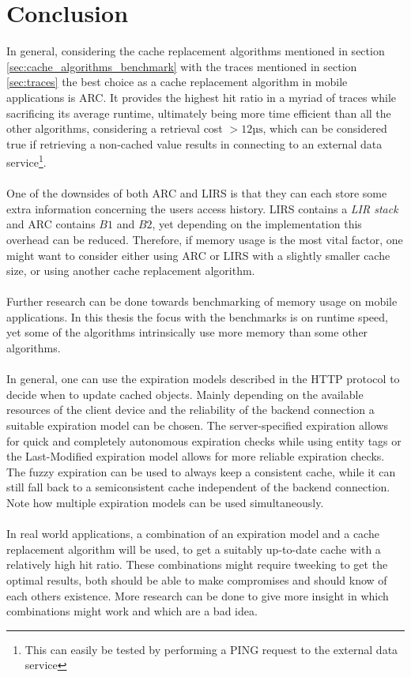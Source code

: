 \documentclass[pdftex,a4paper,12pt,twoside]{report}
\begin{document}
\chapter{Conclusion}
\label{ch:conclusion}
In general, considering the cache replacement algorithms mentioned in section \ref{sec:cache_algorithms_benchmark} with the traces mentioned in section \ref{sec:traces} the best choice as a cache replacement algorithm in mobile applications is ARC. It provides the highest hit ratio in a myriad of traces while sacrificing its average runtime, ultimately being more time efficient than all the other algorithms, considering a retrieval cost $> 12\text{µs}$, which can be considered true if retrieving a non-cached value results in connecting to an external data service\footnote{This can easily be tested by performing a PING request to the external data service}.
\\\\
One of the downsides of both ARC and LIRS is that they can each store some extra information concerning the users access history. LIRS contains a \emph{LIR stack} and ARC contains $B1$ and $B2$, yet depending on the implementation this overhead can be reduced. Therefore, if memory usage is the most vital factor, one might want to consider either using ARC or LIRS with a slightly smaller cache size, or using another cache replacement algorithm.
\\\\
Further research can be done towards benchmarking of memory usage on mobile applications. In this thesis the focus with the benchmarks is on runtime speed, yet some of the algorithms intrinsically use more memory than some other algorithms.
\\\\
In general, one can use the expiration models described in the HTTP protocol to decide when to update cached objects. Mainly depending on the available resources of the client device and the reliability of the backend connection a suitable expiration model can be chosen. The server-specified expiration allows for quick and completely autonomous expiration checks while using entity tags or the Last-Modified expiration model allows for more reliable expiration checks. The fuzzy expiration can be used to always keep a consistent cache, while it can still fall back to a semiconsistent cache independent of the backend connection. Note how multiple expiration models can be used simultaneously.
\\\\
In real world applications, a combination of an expiration model and a cache replacement algorithm will be used, to get a suitably up-to-date cache with a relatively high hit ratio. These combinations might require tweeking to get the optimal results, both should be able to make compromises and should know of each others existence. More research can be done to give more insight in which combinations might work and which are a bad idea.
\end{document}
